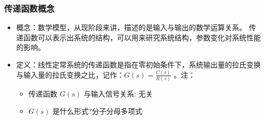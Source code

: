 \documentclass{article}
\begin{document}
\begin{frame}
\frametitle{传递函数概念}
\label{sec-2-1-4}

\begin{itemize}
\item <2->概念：数学模型，从现阶段来讲，描述的是输入与输出的数学运算关系。 传递函数可以表示出系统的结构，可以用来研究系统结构，参数变化对系统性能的影响。
\item <3->定义：线性定常系统的传递函数是指在零初始条件下，系统输出量的拉氏变换与输入量的拉氏变换之比，记作：$G(s)=\frac{C(s)}{R(s)}$ 。注：
\begin{itemize}
\item 传递函数 $G(s)$ 与输入信号关系: 无关
\item $G(s)$ 是什么形式?分子分母多项式
\end{itemize}
\end{itemize}
\end{frame}
\end{document}
